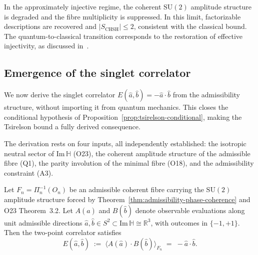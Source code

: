     \begin{remark}
  In the approximately injective regime, the coherent $\mathrm{SU}(2)$
  amplitude structure is degraded and the fibre multiplicity is suppressed.
  In this limit, factorizable descriptions are recovered and
  $|S_{\mathrm{CHSH}}| \leq 2$, consistent with the classical bound.
  The quantum-to-classical transition corresponds to the restoration of
  effective injectivity, as discussed in~\cite{Bell}.
    \end{remark}

\subsection{Emergence of the singlet correlator}
\label{subsec:singlet-correlator}

We now derive the singlet correlator $E(\hat{a},\hat{b}) = -\hat{a}\cdot\hat{b}$
from the admissibility structure, without importing it from quantum mechanics.
This closes the conditional hypothesis of
Proposition~\ref{prop:tsirelson-conditional}, making the Tsirelson bound
a fully derived consequence.

The derivation rests on four inputs, all independently established:
the isotropic neutral sector of $\mathrm{Im}\,\mathbb{H}$ (O23),
the coherent amplitude structure of the admissible fibre (Q1),
the parity involution of the minimal fibre (O18),
and the admissibility constraint (A3).

\begin{theorem}
  \label{thm:singlet-correlator}
  Let $F_n = \Pi_n^{-1}(O_n)$ be an admissible coherent fibre carrying the
  $\mathrm{SU}(2)$ amplitude structure forced by
  Theorem~\ref{thm:admissibility-phase-coherence} and O23 Theorem~3.2.
  Let $A(\hat{a})$ and $B(\hat{b})$ denote observable evaluations along unit
  admissible directions $\hat{a}, \hat{b} \in S^2 \subset
  \mathrm{Im}\,\mathbb{H} \cong \mathbb{R}^3$, with outcomes in $\{-1, +1\}$.
  Then the two-point correlator satisfies
  \begin{equation}
    \label{eq:singlet}
    E(\hat{a}, \hat{b})
    \;:=\;
    \langle A(\hat{a}) \cdot B(\hat{b}) \rangle_{F_n}
    \;=\; -\hat{a} \cdot \hat{b}.
  \end{equation}
\end{theorem}

